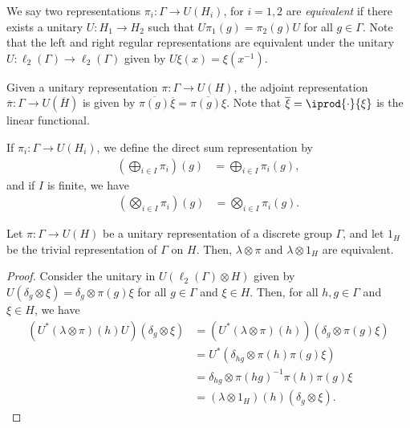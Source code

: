 \documentclass[10pt]{mypackage}
\begin{document}
We say two representations $\pi_i\colon \Gamma\rightarrow U\left( H_i \right)$, for $i=1,2$ are \textit{equivalent} if there exists a unitary $U\colon H_1\rightarrow H_2$ such that $U\pi_1(g) = \pi_2(g)U$ for all $g\in \Gamma$. Note that the left and right regular representations are equivalent under the unitary $U\colon \ell_2\left( \Gamma \right)\rightarrow \ell_2\left( \Gamma \right)$ given by $U\xi(x) = \xi\left( x^{-1} \right)$.

Given a unitary representation $\pi\colon \Gamma\rightarrow U\left( H \right)$, the adjoint representation $ \overline{\pi}\colon \Gamma\rightarrow U( \overline{H} ) $ is given by $ \overline{\pi(g)} \overline{\xi} = \overline{\pi(g)\xi} $. Note that $ \overline{\xi} = \iprod{\cdot}{\xi} $ is the linear functional.

If $\pi_{i}\colon \Gamma\rightarrow U\left( H_i \right)$, we define the direct sum representation by
\begin{align*}
  \left( \bigoplus_{i\in I}\pi_i \right)(g) &= \bigoplus_{i\in I}\pi_i(g),
\end{align*}
and if $I$ is finite, we have
\begin{align*}
  \left( \bigotimes_{i\in I}\pi_i \right)(g) &= \bigotimes_{i\in I}\pi_i(g).
\end{align*}
\begin{lemma}
  Let $\pi\colon \Gamma\rightarrow U(H)$ be a unitary representation of a discrete group $\Gamma$, and let $1_H$ be the trivial representation of $\Gamma$ on $H$. Then, $\lambda\otimes \pi$ and $\lambda\otimes 1_H$ are equivalent.
\end{lemma}
\begin{proof}
  Consider the unitary in $U\left( \ell_2\left( \Gamma \right)\otimes H \right)$ given by $U\left( \delta_g\otimes \xi \right) = \delta_g\otimes \pi(g)\xi$ for all $g\in \Gamma$ and $\xi\in H$. Then, for all $h,g\in \Gamma$ and $\xi\in H$, we have
  \begin{align*}
    \left( U^{\ast}\left( \lambda\otimes \pi \right)(h)U \right)\left( \delta_g\otimes \xi \right) &= \left( U^{\ast}\left( \lambda\otimes \pi \right)(h) \right)\left( \delta_g\otimes \pi(g)\xi \right)\\
                                                                                                   &= U^{\ast}\left( \delta_{hg}\otimes \pi(h)\pi(g)\xi \right)\\
                                                                                                   &= \delta_{hg}\otimes \pi\left( hg \right)^{-1}\pi\left( h \right)\pi\left( g \right)\xi\\
                                                                                                   &= \left( \lambda\otimes 1_H \right)(h)\left( \delta_g\otimes \xi \right).
  \end{align*}
\end{proof}
\end{document}

